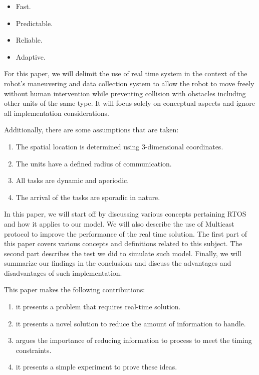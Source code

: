 \documentclass[journal]{IEEEtran}
\begin{document}
\begin{itemize}
\item Fast.
\item Predictable.
\item Reliable.
\item Adaptive.
\end{itemize}

For this paper, we will delimit the use of real time system in the context of the robot's maneuvering and data collection system to allow the robot to move freely without human intervention while preventing collision with obstacles including other units of the same type. It will focus solely on conceptual aspects and ignore all implementation considerations. 

Additionally, there are some assumptions that are taken:

\begin{enumerate}
\item The spatial location is determined using 3-dimensional coordinates.
\item The units have a defined radius of communication.
\item All tasks are dynamic and aperiodic.
\item The arrival of the tasks are sporadic in nature.
\end{enumerate}

In this paper, we will start off by discussing various concepts pertaining RTOS and how it applies to our model. We will also describe the use of Multicast protocol to improve the performance of the real time solution. The first part of this paper covers various concepts and definitions related to this subject. The second part describes the test we did to simulate such model. Finally, we will summarize our findings in the conclusions and discuss the advantages and disadvantages of such implementation.

This paper makes the following contributions:
\begin{enumerate}
\item it presents a problem that requires real-time solution.
\item it presents a novel solution to reduce the amount of information to handle.
\item argues the importance of reducing information to process to meet the timing constraints.
\item it presents a simple experiment to prove these ideas.
\end{enumerate}
\end{document}
